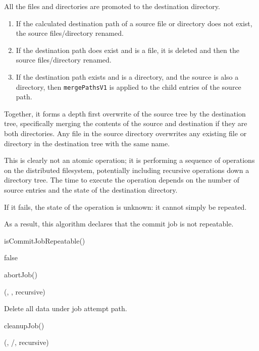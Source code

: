 \documentclass[conference]{IEEEtran}
\begin{document}
All the files and directories are promoted to the destination directory.

\begin{enumerate}
  \item If the calculated destination path of a source file or directory does
  not exist, the source files/directory renamed.
  \item If the destination path does exist and is a file, it is deleted and then
  the source files/directory renamed.
  \item If the destination path exists and is a directory, and the source
  is also a directory, then \texttt{mergePathsV1} is applied to the child
  entries of the source path.
\end{enumerate}

Together, it forms a depth first overwrite of the source tree by the destination
tree, specifically merging the contents of the source and destination if they
are both directories.
Any file in the source directory overwrites any existing file or directory
in the destination tree with the same name.


This is clearly not an atomic operation;
it is performing a sequence of operations on the distributed filesystem,
potentially including recursive operations down a directory tree.
The time to execute the operation depends on the number of source entries
and the state of the destination directory.

If it fails, the state of the operation is unknown: it cannot simply
be repeated.

As a result, this algorithm declares that the commit job is not repeatable.

\begin{function}
\caption{isCommitJobRepeatable()}
  false\;
\end{function}

\begin{procedure}
\caption{abortJob()}

\delete(\fs, \jobAttemptPath, recursive)\;
\end{procedure}

Delete all data under job attempt path.

\begin{procedure}
\caption{cleanupJob()}

\delete(\fs, \dest/\temp, recursive)\;
\end{procedure}
\end{document}
